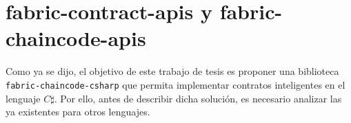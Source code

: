 %
%
%
%





%
%



\section{fabric-contract-apis y fabric-chaincode-apis}
Como ya se dijo, el objetivo de este trabajo de tesis es proponer una biblioteca \texttt{fabric-chaincode-csharp} que permita implementar contratos inteligentes en el lenguaje $ C\sharp $. Por ello, antes de describir dicha solución, es necesario analizar las ya existentes para otros lenguajes.

